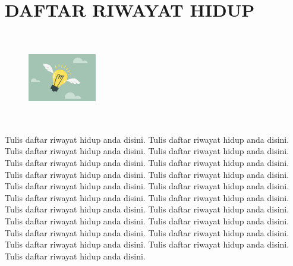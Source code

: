 %
%
%
%

\chapter*{DAFTAR RIWAYAT HIDUP}
\pagestyle{empty}

\noindent
\begin{figure}
\includegraphics[width=3cm, height=4cm]{konten/gambar/fotoprofil.jpg}
\end{figure}
Tulis daftar riwayat hidup anda disini. Tulis daftar riwayat hidup anda disini. Tulis daftar riwayat hidup anda disini. Tulis daftar riwayat hidup anda disini. Tulis daftar riwayat hidup anda disini. Tulis daftar riwayat hidup anda disini. Tulis daftar riwayat hidup anda disini.
Tulis daftar riwayat hidup anda disini. Tulis daftar riwayat hidup anda disini. Tulis daftar riwayat hidup anda disini. Tulis daftar riwayat hidup anda disini. Tulis daftar riwayat hidup anda disini. Tulis daftar riwayat hidup anda disini. Tulis daftar riwayat hidup anda disini.
Tulis daftar riwayat hidup anda disini. Tulis daftar riwayat hidup anda disini. Tulis daftar riwayat hidup anda disini. Tulis daftar riwayat hidup anda disini. Tulis daftar riwayat hidup anda disini. Tulis daftar riwayat hidup anda disini. Tulis daftar riwayat hidup anda disini.
